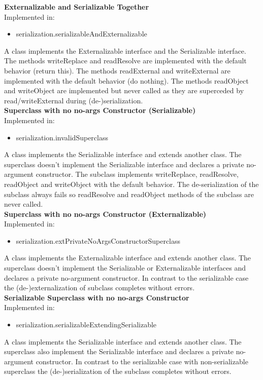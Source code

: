 \documentclass{article}
\begin{document}
\noindent
\textbf{Externalizable and Serializable Together}\\
Implemented in: 
\begin{itemize}
    \item serialization.serializableAndExternalizable
\end{itemize}
A class implements the Externalizable interface and the Serializable interface. The methods writeReplace and readResolve are implemented with the default behavior (return this). The methods readExternal and writeExternal are implemented with the default behavior (do nothing). The methods readObject and writeObject are implemented but never called as they are superceded by read/writeExternal during (de-)serialization.\\

\noindent
\textbf{Superclass with no no-args Constructor (Serializable)}\\
Implemented in: 
\begin{itemize}
    \item serialization.invalidSuperclass
\end{itemize}
A class implements the Serializable interface and extends another class. The superclass doesn't implement the Serializable interface and declares a private no-argument constructor. The subclass implements writeReplace, readResolve, readObject and writeObject with the default behavior. The de-serialization of the subclass always fails so readResolve and readObject methods of the subclass are never called.\\

\noindent
\textbf{Superclass with no no-args Constructor (Externalizable)}\\
Implemented in: 
\begin{itemize}
    \item serialization.extPrivateNoArgsConstructorSuperclass
\end{itemize}
A class implements the Externalizable interface and extends another class. The superclass doesn't implement the Serializable or Externalizable interfaces and declares a private no-argument constructor. In contrast to the serializable case the (de-)externalization of subclass completes without errors.\\

\noindent
\textbf{Serializable Superclass with no no-args Constructor}\\
Implemented in: 
\begin{itemize}
    \item serialization.serializableExtendingSerializable
\end{itemize}
A class implements the Serializable interface and extends another class. The superclass also implement the Serializable interface and declares a private no-argument constructor. In contrast to the serializable case with non-serializable superclass the (de-)serialization of the subclass completes without errors.\\
\end{document}
